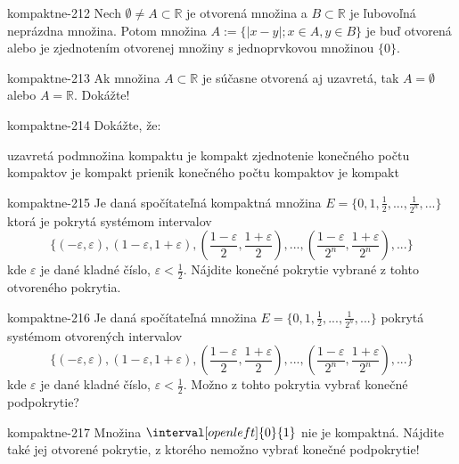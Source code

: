 \begin{defproblem}{kompaktne-212}
Nech $\emptyset \neq A \subset \mathbb{R}$ je otvorená množina a $B \subset
\mathbb{R}$ je ľubovoľná neprázdna množina. Potom množina $A:=\{|x-y|; x \in A,
y \in B\}$ je buď otvorená alebo je zjednotením otvorenej množiny s
jednoprvkovou množinou $\{0 \}$.
\end{defproblem}

\begin{defproblem}{kompaktne-213}
Ak množina $A \subset \mathbb{R}$ je súčasne otvorená aj uzavretá, tak
$A=\emptyset$ alebo $A=\mathbb{R}$. Dokážte!
\end{defproblem}

\begin{defproblem}{kompaktne-214}
Dokážte, že:
\begin{tasks}
\task uzavretá podmnožina kompaktu je kompakt
\task zjednotenie konečného počtu kompaktov je kompakt
\task prienik konečného počtu kompaktov je kompakt
\end{tasks}
\end{defproblem}

\begin{defproblem}{kompaktne-215}
Je daná spočítateľná kompaktná množina
$E=\{0,1,\frac{1}{2},...,\frac{1}{2^n},...\}$
ktorá je pokrytá systémom intervalov
\[
\{
    (-\varepsilon, \varepsilon),
    (1-\varepsilon,1+\varepsilon),
    (\frac{1-\varepsilon}{2},\frac{1+\varepsilon}{2}),
    ...,
    (\frac{1-\varepsilon}{2^n},
    \frac{1+\varepsilon}{2^n}),
    ...
\}
\]
kde $\varepsilon$ je dané kladné číslo, $\varepsilon<\frac{1}{2}$. Nájdite
konečné pokrytie vybrané z tohto otvoreného pokrytia.
\end{defproblem}

\begin{defproblem}{kompaktne-216}
Je daná spočítateľná množina
$E=\{0,1,\frac{1}{2},...,\frac{1}{2^n},... \}$
pokrytá systémom otvorených intervalov
$$
\{
    (-\varepsilon, \varepsilon),
    (1-\varepsilon,1+\varepsilon),
    (\frac{1-\varepsilon}{2},\frac{1+\varepsilon}{2}),
    ...,
    (\frac{1-\varepsilon}{2^n},\frac{1+\varepsilon}{2^n}),
    ...
\}
$$
kde $\varepsilon$ je dané kladné číslo, $\varepsilon<\frac{1}{2}$. Možno z tohto
pokrytia vybrať konečné podpokrytie?
\end{defproblem}

\begin{defproblem}{kompaktne-217}
Množina $\interval[open left]{0}{1}$ nie je kompaktná. Nájdite také jej otvorené
pokrytie, z ktorého nemožno vybrať konečné podpokrytie!
\end{defproblem}

